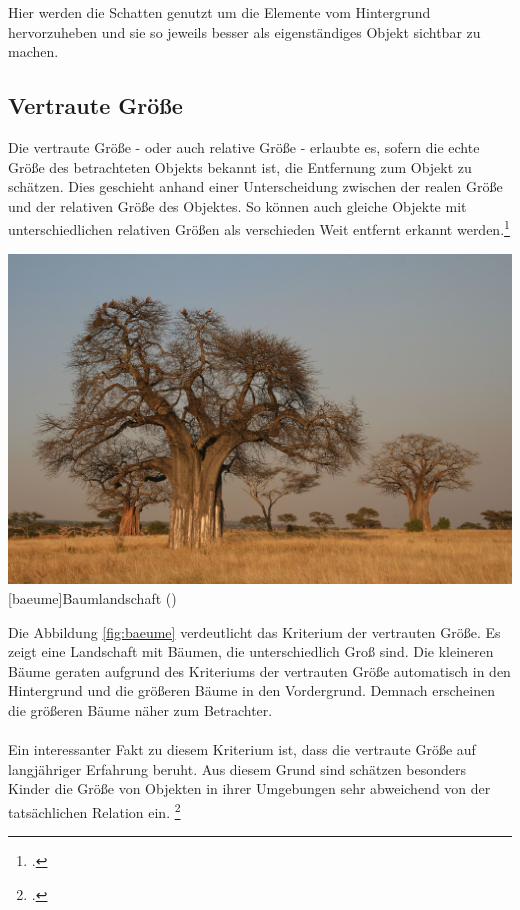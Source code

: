 Hier werden die Schatten genutzt um die Elemente vom Hintergrund hervorzuheben und sie so jeweils besser als eigenständiges Objekt sichtbar zu machen.

\subsection{Vertraute Größe}
Die vertraute Größe - oder auch relative Größe - erlaubte es, sofern die echte Größe des betrachteten Objekts bekannt ist, die Entfernung zum Objekt zu schätzen. Dies geschieht anhand einer Unterscheidung zwischen der realen Größe und der relativen Größe des Objektes. So können auch gleiche Objekte mit unterschiedlichen relativen Größen als verschieden Weit entfernt erkannt werden.\footcite[Vgl.][S.43]{Ass16}

\vspace{1em}
\begin{minipage}{\linewidth}
	\centering
	\includegraphics[width=0.7\linewidth]{images/baeume.jpg}
	[baeume]{Baumlandschaft (\cite{yokyXX})}
	\label{fig:baeume}
\end{minipage}
\vspace{1em}

Die Abbildung \ref{fig:baeume} verdeutlicht das Kriterium der vertrauten Größe. Es zeigt eine Landschaft mit Bäumen, die unterschiedlich Groß sind. Die kleineren Bäume geraten aufgrund des Kriteriums der vertrauten Größe automatisch in den Hintergrund und die größeren Bäume in den Vordergrund. Demnach erscheinen die größeren Bäume näher zum Betrachter.\\
\\
Ein interessanter Fakt zu diesem Kriterium ist, dass die vertraute Größe auf langjähriger Erfahrung beruht. Aus diesem Grund sind schätzen besonders Kinder die Größe von Objekten in ihrer Umgebungen sehr abweichend von der tatsächlichen Relation ein. \footcite[Vgl.]{Helm1867}

